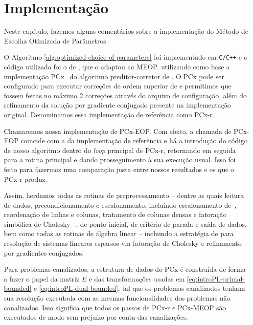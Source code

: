 

\chapter{Implementação}
\label{chap:implementa}
Neste capítulo, fazemos alguns comentários sobre a implementação do Método de Escolha Otimizada de Parâmetros. 


O Algoritmo \ref{alg:optimized-choice-of-parameters} foi implementado em  \texttt{C/C++} e o código utilizado foi o de \textcite{VillasBoas:2012ur,VillasBoas2013:wn}, que o adaptou ao MEOP. utilizando como base a implementação PCx~\cite{Czyzyk:1999hk} do algoritmo preditor-corretor de \textcite{Mehrotra:1992wr}. O PCx pode ser configurado para executar correções de ordem superior de \textcite{Gondzio:1996uw} e permitimos que fossem feitas no máximo 2 correções através do arquivo de configuração, além do  refinamento da solução por gradiente conjugado presente na implementação original. Denominamos essa implementação de referência como PCx-r.

  Chamaremos nossa implementação de PCx-EOP. Com efeito, a chamada de PCx-EOP coincide com a da implementação de referência e há a introdução do código de nosso algoritmo dentro do \emph{loop} principal de PCx-r,  retornando em seguida para a rotina principal e dando prosseguimento à sua execução usual. Isso foi feito para fazermos uma comparação justa entre nossos resultados e os que o PCx-r produz. 

  Assim, herdamos todas as rotinas de preprocessamento -- dentre as quais leitura de dados, precondicionamento e escalonamento, incluindo escalonamento de~\textcite{Curtis:1972cp}, reordenação de linhas e colunas, tratamento de colunas densas e fatoração simbólica de Cholesky --, de ponto inicial, de critério de parada e saída de dados,   bem como todas as rotinas de álgebra linear -- incluindo a estratégia  de \textcite{Ng:1993uz} para resolução de sistemas lineares esparsos via fatoração de Cholesky  e refinamento por gradientes conjugados. 


Para problemas canalizados, a estrutura de dados do PCx é construída de forma a fazer o papel da matriz $E$ e das transformações usadas em \eqref{eq:introPL-primal-bounded} e \eqref{eq:introPL-dual-bounded}, tal que os problemas canalizados tenham sua resolução executada com  as mesmas funcionalidades dos problemas não canalizados. Isso significa que todos os passos de  PCx-r e PCx-MEOP são executados de modo sem prejuízo por conta das canalizações.




